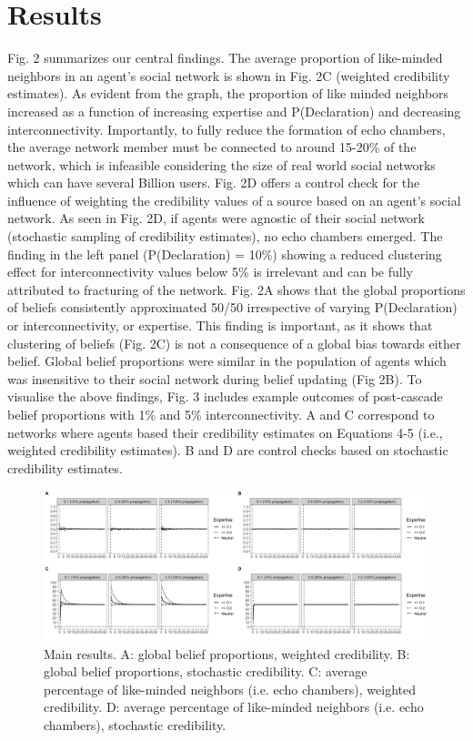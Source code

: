 \documentclass[doc,floatsintext]{apa6}
\begin{document}
\section{Results}
Fig. 2 summarizes our central findings. The average proportion of like-minded neighbors in an agent's social network is shown in Fig. 2C (weighted credibility estimates). As evident from the graph, the proportion of like minded neighbors increased as a function of increasing expertise and P(Declaration) and decreasing interconnectivity. Importantly, to fully reduce the formation of echo chambers, the average network member must be connected to around 15-20\% of the network, which is infeasible considering the size of real world social networks which can have several Billion users. Fig. 2D offers a control check for the influence of weighting the credibility values of a source based on an agent's social network. As seen in Fig. 2D, if agents were agnostic of their social network (stochastic sampling of credibility estimates), no echo chambers emerged. The finding in the left panel (P(Declaration) = 10\%) showing a reduced clustering effect for interconnectivity values below 5\% is irrelevant and can be fully attributed to fracturing of the network. Fig. 2A shows that the global proportions of beliefs consistently approximated 50/50 irrespective of varying P(Declaration) or interconnectivity, or expertise. This finding is important, as it shows that clustering of beliefs (Fig. 2C) is not a consequence of a global bias towards either belief. Global belief proportions were similar in the population of agents which was insensitive to their social network during belief updating (Fig 2B). To visualise the above findings, Fig. 3 includes example outcomes of post-cascade belief proportions with 1\% and 5\% interconnectivity. A and C correspond to networks where agents based their credibility estimates on Equations 4-5 (i.e., weighted credibility estimates). B and D are control checks based on stochastic credibility estimates. 


\begin{figure}[!t]
\centering
\includegraphics[width=1\columnwidth]{img/results.png}
\caption{Main results. A: global belief proportions, weighted credibility. B: global belief proportions, stochastic credibility. C: average percentage of like-minded neighbors (i.e. echo chambers), weighted credibility. D: average percentage of like-minded neighbors (i.e. echo chambers), stochastic credibility.} 
\label{fig:rich_vis}
\end{figure}
\end{document}
